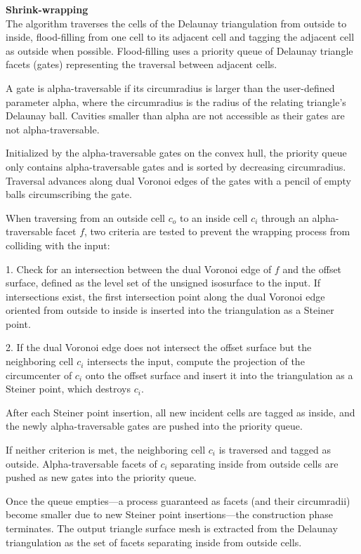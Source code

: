 \documentclass[12pt]{article}
\begin{document}
\textbf{Shrink-wrapping}\\
The algorithm traverses the cells of the Delaunay triangulation from outside to inside,
flood-filling from one cell to its adjacent cell and tagging the adjacent cell as
outside when possible. Flood-filling uses a priority queue of Delaunay triangle facets
(gates) representing the traversal between adjacent cells.

A gate is alpha-traversable if its circumradius is larger than the user-defined
parameter alpha, where the circumradius is the radius of the relating triangle's
Delaunay ball. Cavities smaller than alpha are not accessible as their gates are not
alpha-traversable.

Initialized by the alpha-traversable gates on the convex hull, the priority queue only
contains alpha-traversable gates and is sorted by decreasing circumradius. Traversal
advances along dual Voronoi edges of the gates with a pencil of empty balls
circumscribing the gate.



When traversing from an outside cell \( c_o \) to an inside cell \( c_i \) through an
alpha-traversable facet \( f \), two criteria are tested to prevent the wrapping process
from colliding with the input:

1. Check for an intersection between the dual Voronoi edge of \( f \) and the offset
surface, defined as the level set of the unsigned isosurface to the input. If intersections
exist, the first intersection point along the dual Voronoi edge oriented from outside to
inside is inserted into the triangulation as a Steiner point.

2. If the dual Voronoi edge does not intersect the offset surface but the neighboring cell
\( c_i \) intersects the input, compute the projection of the circumcenter of \( c_i \)
onto the offset surface and insert it into the triangulation as a Steiner point, which
destroys \( c_i \).

After each Steiner point insertion, all new incident cells are tagged as inside, and the
newly alpha-traversable gates are pushed into the priority queue.

If neither criterion is met, the neighboring cell \( c_i \) is traversed and tagged as
outside. Alpha-traversable facets of \( c_i \) separating inside from outside cells are
pushed as new gates into the priority queue.

Once the queue empties—a process guaranteed as facets (and their circumradii) become
smaller due to new Steiner point insertions—the construction phase terminates. The output
triangle surface mesh is extracted from the Delaunay triangulation as the set of facets
separating inside from outside cells.
\end{document}
